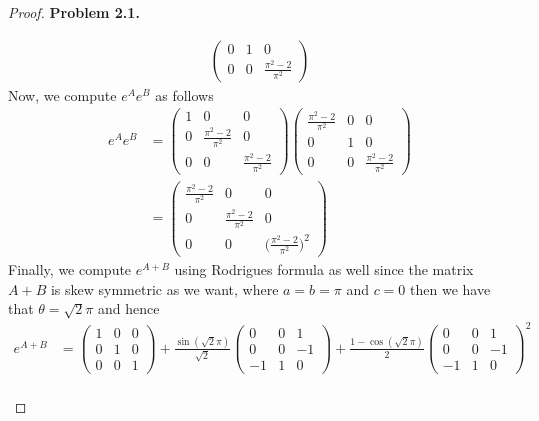 \documentclass[11pt]{article}
\theoremstyle{definition}
\begin{document}
\begin{proof}{\textbf{Problem 2.1.}}
\begin{itemize}
\begin{align*}
\begin{pmatrix}
            0 & 1 & 0\\
            0 & 0 & \frac{\pi^2 - 2}{\pi^2}
        \end{pmatrix}        
    \end{align*}
    Now, we compute $e^Ae^B$ as follows
    \begin{align*}
        e^Ae^B &= \begin{pmatrix}
            1 & 0 & 0\\
            0 & \frac{\pi^2 - 2}{\pi^2} & 0\\
            0 & 0 & \frac{\pi^2 - 2}{\pi^2}
        \end{pmatrix}\begin{pmatrix}
            \frac{\pi^2 - 2}{\pi^2} & 0 & 0\\
            0 & 1 & 0\\
            0 & 0 & \frac{\pi^2 - 2}{\pi^2}
        \end{pmatrix}\\
        &= \begin{pmatrix}
            \frac{\pi^2 - 2}{\pi^2} & 0 & 0\\
            0 & \frac{\pi^2 - 2}{\pi^2} & 0\\
            0 & 0 & \big(\frac{\pi^2 - 2}{\pi^2}\big)^2
        \end{pmatrix}
    \end{align*}
    Finally, we compute $e^{A + B}$ using Rodrigues formula as well since the
    matrix $A + B$ is skew symmetric as we want, where $a = b = \pi$ and $c = 0$
    then we have that $\theta = \sqrt{2}\pi$ and hence
    \begin{align*}
        e^{A + B} &= \begin{pmatrix}
            1 & 0 & 0\\
            0 & 1 & 0\\
            0 & 0 & 1
        \end{pmatrix}
        + \frac{\sin(\sqrt{2}\pi)}{\sqrt{2}}\begin{pmatrix}
            0 & 0 & 1\\
            0 & 0 & -1\\
            -1 & 1 & 0
        \end{pmatrix}
        + \frac{1 - \cos(\sqrt{2}\pi)}{2}\begin{pmatrix}
            0 & 0 & 1\\
            0 & 0 & -1\\
            -1 & 1 & 0
        \end{pmatrix}^2\\

\end{align*}
\end{itemize}
\end{proof}
\end{document}
